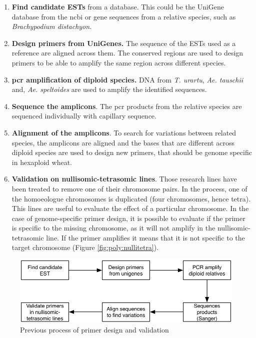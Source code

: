 \begin{enumerate}
    \item \textbf{Find candidate ESTs} from a database. This could be the UniGene database from the \gls{ncbi} or gene sequences from a relative species, such as \textit{Brachypodium distachyon}.
    \item \textbf{Design primers from UniGenes.} The sequence of the ESTs used as a reference are aligned across them. The conserved regions are used to design primers to be able to amplify the same region across different species.
    \item \textbf{\gls{pcr} amplification of diploid species.} DNA from \textit{T. urartu}, \textit{Ae. tauschii} and, \textit{Ae. speltoides} are used to amplify the identified sequences. 
    \item \textbf{Sequence the amplicons}. The \gls{pcr} products from the relative species are sequenced individually with capillary sequence. 
    \item \textbf{Alignment of the amplicons}. To search for variations between related species, the amplicons are aligned and the bases that are different across diploid species are used to design new primers, that should be genome specific in hexaploid wheat. 
    \item \textbf{Validation on nullisomic-tetrasomic lines}. 
Those research lines have been treated to remove one of their chromosome pairs. 
In the process, one of the homoeologue chromosomes is duplicated (four chromosomes, hence tetra).
This lines are useful to evaluate the effect of a particular chromosome. 
In the case of genome-specific primer design, it is possible to evaluate if the primer is specific to the missing chromosome, as it will not amplify in the nullisomic-tetrasomic line. 
If the primer amplifies it means that it is not specific to the target chromosome 
(Figure \ref{fig:poly:nullitetra}).
\end{enumerate}

\begin{figure}
\includegraphics[width=1\textwidth]{PolyMarker/Figures/disc/OldGSP.pdf}
\caption{Previous process of primer design and validation}
\label{fig:poly:oldGSP}
\end{figure}

